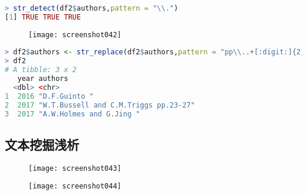 \documentclass[11pt,a4paper,oneside]{book}
\begin{document}
\begin{lstlisting}[language=r]
> str_detect(df2$authors,pattern = "\\.")
[1] TRUE TRUE TRUE
\end{lstlisting}
\begin{figure}[H]
	\centering
	\texttt{[image: screenshot042]}
\end{figure}

\begin{lstlisting}[language=r]
> df2$authors <- str_replace(df2$authors,pattern = "pp\\..+[:digit:]{2,3}\\-[:digit:]{2,3}",replacement = "")
> df2
# A tibble: 3 x 2
   year authors                              
  <dbl> <chr>                                
1  2016 "D.F.Guinto "                        
2  2017 "W.T.Bussell and C.M.Triggs pp.23-27"
3  2017 "A.W.Holmes and G.Jing " 
\end{lstlisting}

\subsection{文本挖掘浅析}
\begin{figure}[H]
	\centering
	\texttt{[image: screenshot043]}
\end{figure}
\begin{figure}[H]
	\centering
	\texttt{[image: screenshot044]}
\end{figure}

\begin{lstlisting}[language=r]
	
\end{lstlisting}

\begin{lstlisting}[language=r]
	
\end{lstlisting}

\begin{lstlisting}[language=r]
	
\end{lstlisting}

\begin{lstlisting}[language=r]
	
\end{lstlisting}

\begin{lstlisting}[language=r]
	
\end{lstlisting}
\end{document}
